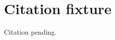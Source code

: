 \documentclass{article}
\begin{document}
\section*{Citation fixture}
Citation pending.


\end{document}
